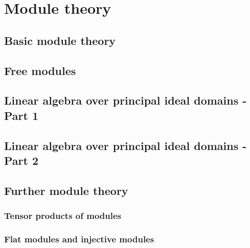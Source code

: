 \part{Module theory}\label{module theory}

\chapter{Basic module theory}
    
    
    
    
    
    

\chapter{Free modules}
    
    
\chapter{Linear algebra over principal ideal domains - Part 1}
    
    
    
    
    

\chapter{Linear algebra over principal ideal domains - Part 2}
    
    
    
    

\chapter{Further module theory}
    \section{Tensor products of modules}
    \section{Flat modules and injective modules}
